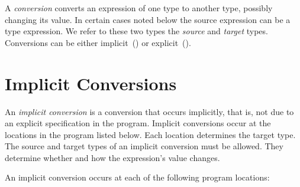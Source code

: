 \label{Conversions}

A \emph{conversion} converts an expression of one type to another type,
possibly changing its value.
In certain cases noted below the source expression can be a type expression.
We refer to these two types the \emph{source} and \emph{target} types.
Conversions can be either
implicit~() or
explicit~().


\section{Implicit Conversions}
\label{Implicit_Conversions}

An \emph{implicit conversion} is a conversion that occurs implicitly,
that is, not due to an explicit specification in the program.
Implicit conversions occur at the locations in the program listed below.
Each location determines the target type.
The source and target types of an implicit conversion must be allowed.
They determine whether and how the expression's value changes.

An implicit conversion occurs at each of the following program locations:

